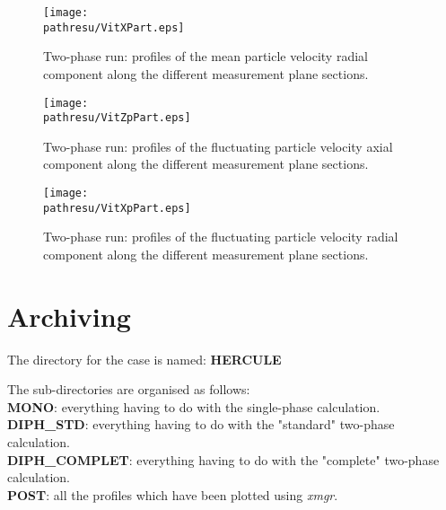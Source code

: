 \documentclass[a4paper,twoside,12pt]{article}
\newcommand{\pathresu}{./FIGURES}
\begin{document}
\begin{figure}[h]
   \centerline{\texttt{[image: \\pathresu/VitXPart.eps]}}
   \caption{Two-phase run: profiles of the mean particle velocity radial component along the different measurement plane sections.}
   \label{VitXPart}
\end{figure}

\begin{figure}[h]
   \centerline{\texttt{[image: \\pathresu/VitZpPart.eps]}}
   \caption{Two-phase run: profiles of the fluctuating particle velocity axial component along the different measurement plane sections.}
   \label{VitZpPart}
\end{figure}

\begin{figure}[h]
   \centerline{\texttt{[image: \\pathresu/VitXpPart.eps]}}
   \caption{Two-phase run: profiles of the fluctuating particle velocity radial component along the different measurement plane sections.}
   \label{VitXpPart}
\end{figure}

\clearpage

\section{Archiving}

The directory for the case is named: \textbf{HERCULE}

The sub-directories are organised as follows:
\medskip\\
\hspace*{2cm}\textbf{MONO}: everything having to do with the single-phase calculation.
\medskip\\
\hspace*{2cm}\textbf{DIPH\_STD}: everything having to do with the "standard" two-phase calculation.
\medskip\\
\hspace*{2cm}\textbf{DIPH\_COMPLET}: everything having to do with the "complete" two-phase calculation.
\medskip\\
\hspace*{2cm}\textbf{POST}: all the profiles which have been plotted using \textit{xmgr}.


\passepage
\end{document}
